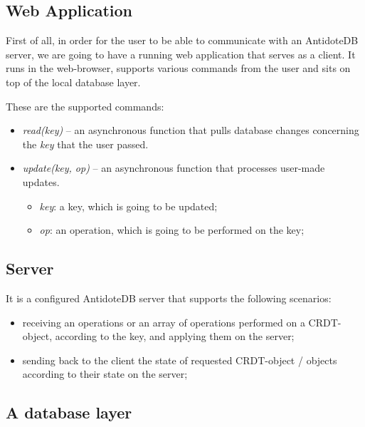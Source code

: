 \subsection{Web Application}

First of all, in order for the user to be able to communicate with an AntidoteDB server, we are going to have a running web application that serves as a client. It runs in the web-browser, supports various commands from the user and sits on top of the local database layer. 

\vspace{5mm}These are the supported commands:

\begin{itemize}
    \item \textit{read(key)} -- an asynchronous function that pulls database changes concerning the \textit{key} that the user passed.
    \item \textit{update(key, op)}  -- an asynchronous function that processes user-made updates.
     \begin{itemize}
         \item \textit{key}: a key, which is going to be updated;
         \item \textit{op}: an operation, which is going to be performed on the key;
     \end{itemize}
  \end{itemize}

\subsection{Server}

It is a configured AntidoteDB server that supports the following scenarios:

\begin{itemize}
    \item receiving an operations or an array of operations performed on a CRDT-object, according to the key, and applying them on the server;
    \item sending back to the client the state of requested CRDT-object / objects according to their state on the server;
\end{itemize}

\subsection{A database layer}

